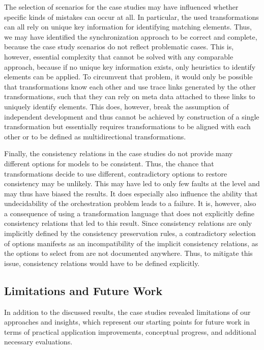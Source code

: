 The selection of scenarios for the case studies may have influenced whether specific kinds of mistakes can occur at all.
In particular, the used transformations can all rely on unique key information for identifying matching elements.
Thus, we may have identified the synchronization approach to be correct and complete, because the case study scenarios do not reflect problematic cases.
This is, however, essential complexity that cannot be solved with any comparable approach, because if no unique key information exists, only heuristics to identify elements can be applied.
To circumvent that problem, it would only be possible that transformations know each other and use trace links generated by the other transformations, such that they can rely on meta data attached to these links to uniquely identify elements.
This does, however, break the assumption of independent development and thus cannot be achieved by construction of a single transformation but essentially requires transformations to be aligned with each other or to be defined as multidirectional transformations.

Finally, the consistency relations in the case studies do not provide many different options for models to be consistent.
Thus, the chance that transformations decide to use different, contradictory options to restore consistency may be unlikely.
This may have led to only few faults at the \levelnetworkrule level and may thus have biased the results.
It does especially also influence the ability that undecidability of the orchestration problem leads to a failure.
It is, however, also a consequence of using a transformation language that does not explicitly define consistency relations that led to this result.
Since consistency relations are only implicitly defined by the consistency preservation rules, a contradictory selection of options manifests as an incompatibility of the implicit consistency relations, as the options to select from are not documented anywhere.
Thus, to mitigate this issue, consistency relations would have to be defined explicitly.


\subsection{Limitations and Future Work}
\label{chap:correctness_evaluation:categorization:limitations}

In addition to the discussed results, the case studies revealed limitations of our approaches and insights, which represent our starting points for future work in terms of practical application improvements, conceptual progress, and additional necessary evaluations.

